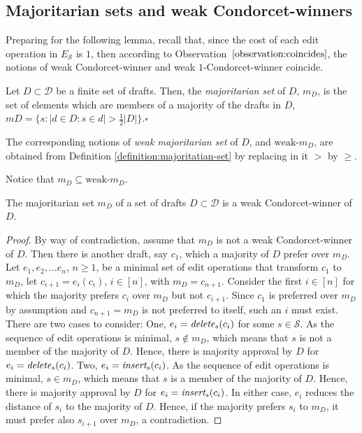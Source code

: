 \documentclass[sigconf]{aamas}  %
\newcommand{\qqed}{\hfill$\square$}
\newcommand{\calD}{\mathcal{D}}
\newcommand{\calS}{\mathcal{S}}
\newcommand{\iinsert}[1]{\emph{insert}_{#1}}
\newcommand{\ddelete}[1]{\emph{delete}_{#1}}
\begin{document}
\subsection{Majoritarian sets and weak Condorcet-winners}

Preparing for the following lemma, recall that, since the cost of each edit operation in $E_\calS$ is $1$, then according to Observation~$\ref{observation:coincides}$, the notions of weak Condorcet-winner and weak $1$-Condorcet-winner coincide.

\begin{definition}\label{definition:majoritatian-set}
%
Let $D \subset \calD$ be a finite set of drafts. Then, the \emph{majoritarian set} of $D$, $m_D$, is the set of elements which are members of a majority of the drafts in $D$, $mD = \{s: |d \in D : s \in d| > \frac{1}{2}{|D|}\}$.\qqed
%
\end{definition}

The corresponding notions of \emph{weak majoritarian set} of $D$, and $\textrm{weak-}m_D$, are obtained from Definition \ref{definition:majoritatian-set} by replacing in it $>$ by $\ge$.

Notice that $m_D \subseteq \textrm{weak-}m_D$.

\begin{lemma}
\label{lemma:condorcet-majoritarian}
The majoritarian set $m_D$ of a set of drafts $D \subset \calD$ is a weak Condorcet-winner of $D$.
\end{lemma}

\begin{proof}
%
By way of contradiction, assume that $m_D$ is not a weak Condorcet-winner of $D$.  Then there is another draft, say $c_1$, which a majority of $D$ prefer over $m_D$.  
Let $e_1, e_2, \ldots e_n$, $n \ge 1$, be a minimal set of edit operations that transform $c_1$ to $m_D$,  let $c_{i+1} = e_i(c_i)$, $ i \in [n]$, with $m_D = c_{n+1}$. Consider the first $i \in [n]$ for which the majority prefers $c_i$ over $m_D$ but not $c_{i+1}$.  Since $c_1$ is preferred over $m_D$ by assumption and $c_{n+1} = m_D$ is not preferred to itself, such an $i$ must exist.   
There are two cases to consider: One, $e_i = \ddelete{s}(c_i)$ for some $s \in \calS$.  As the sequence of edit operations is minimal,  $s \notin m_D$, which means that $s$ is not a member of the majority of $D$.  Hence, there is majority approval by $D$ for $e_i = \ddelete{s}(c_i)$.
Two, $e_i = \iinsert{s}(c_i)$.  As the sequence of edit operations is minimal,  $s \in m_D$, which means that $s$ is a member of the majority of $D$.  Hence, there is majority approval by $D$ for $e_i = \iinsert{s}(c_i)$.  In either case, $e_i$ reduces the distance of $s_i$ to the majority of $D$. Hence, if the majority prefers $s_i$ to $m_D$, it must prefer also $s_{i+1}$ over $m_D$, a contradiction.
%
\end{proof}
\end{document}
